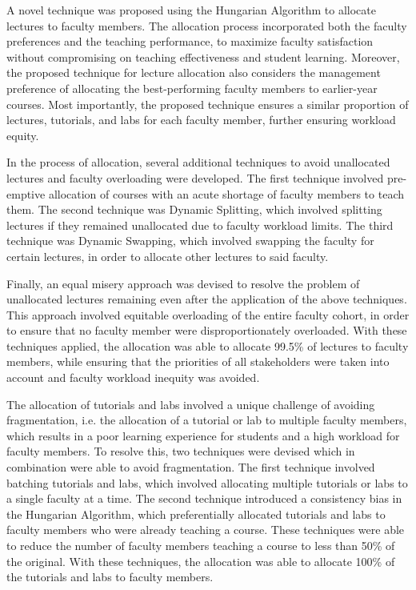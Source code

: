 A novel technique was proposed using the Hungarian Algorithm to allocate lectures to faculty members. The allocation process incorporated both the faculty preferences and the teaching performance, to maximize faculty satisfaction without compromising on teaching effectiveness and student learning. Moreover, the proposed technique for lecture allocation also considers the management preference of allocating the best-performing faculty members to earlier-year courses. Most importantly, the proposed technique ensures a similar proportion of lectures, tutorials, and labs for each faculty member, further ensuring workload equity.

In the process of allocation, several additional techniques to avoid unallocated lectures and faculty overloading were developed. The first technique involved pre-emptive allocation of courses with an acute shortage of faculty members to teach them. The second technique was Dynamic Splitting, which involved splitting lectures if they remained unallocated due to faculty workload limits. The third technique was Dynamic Swapping, which involved swapping the faculty for certain lectures, in order to allocate other lectures to said faculty.

Finally, an equal misery approach was devised to resolve the problem of unallocated lectures remaining even after the application of the above techniques. This approach involved equitable overloading of the entire faculty cohort, in order to ensure that no faculty member were disproportionately overloaded. With these techniques applied, the allocation was able to allocate 99.5\% of lectures to faculty members, while ensuring that the priorities of all stakeholders were taken into account and faculty workload inequity was avoided.

The allocation of tutorials and labs involved a unique challenge of avoiding fragmentation, i.e. the allocation of a tutorial or lab to multiple faculty members, which results in a poor learning experience for students and a high workload for faculty members. To resolve this, two techniques were devised which in combination were able to avoid fragmentation. The first technique involved batching tutorials and labs, which involved allocating multiple tutorials or labs to a single faculty at a time. The second technique introduced a consistency bias in the Hungarian Algorithm, which preferentially allocated tutorials and labs to faculty members who were already teaching a course. These techniques were able to reduce the number of faculty members teaching a course to less than 50\% of the original. With these techniques, the allocation was able to allocate 100\% of the tutorials and labs to faculty members.

